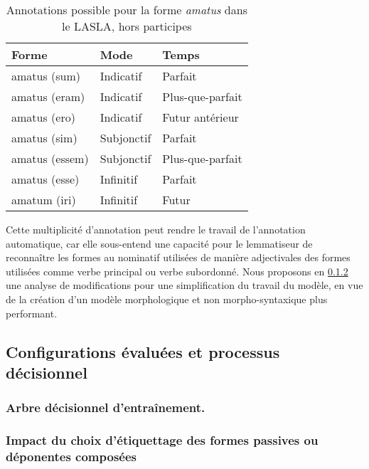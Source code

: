 
\newpara

\begin{table}[]
\centering
\begin{tabular}{@{}lll@{}}
\toprule
Forme & Mode & Temps \\ \midrule
amatus (sum) & Indicatif & Parfait \\
amatus (eram) & Indicatif & Plus-que-parfait \\
amatus (ero) & Indicatif & Futur antérieur \\
amatus (sim) & Subjonctif & Parfait \\
amatus (essem) & Subjonctif & Plus-que-parfait \\
amatus (esse) & Infinitif & Parfait \\
amatum (iri) & Infinitif & Futur \\ \bottomrule
\end{tabular}
\caption{Annotations possible pour la forme \textit{amatus} dans le LASLA, hors participes}
\label{table:amatus_forms}
\end{table}

Cette multiplicité d'annotation peut rendre le travail de l'annotation automatique, car elle sous-entend une capacité pour le lemmatiseur de reconnaître les formes au nominatif utilisées de manière adjectivales des formes utilisées comme verbe principal ou verbe subordonné. Nous proposons en \ref{subsec:training:lasla-modification} une analyse de modifications pour une simplification du travail du modèle, en vue de la création d'un modèle morphologique et non morpho-syntaxique plus performant.

\subsection{Configurations évaluées et processus décisionnel}

\subsubsection{Arbre décisionnel d'entraînement.}

\subsubsection{Impact du choix d'étiquettage des formes passives ou déponentes composées}
\label{subsec:training:lasla-modification}

